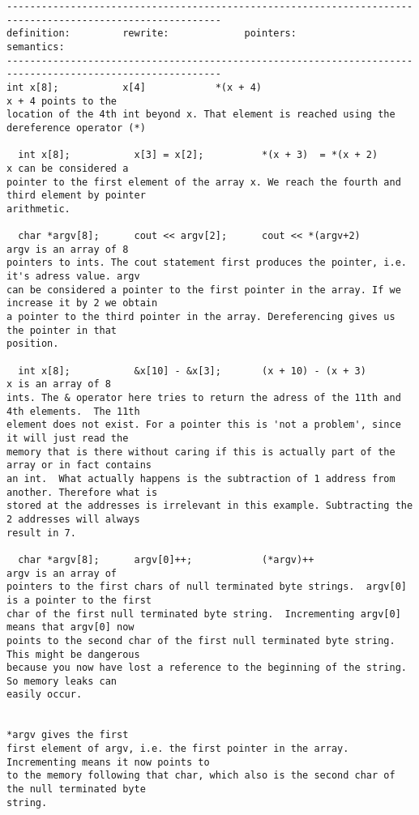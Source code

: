\documentclass{article}[9pt]
\begin{document}
\begin{verbatim}
-----------------------------------------------------------------------------------------------------------
definition:         rewrite:             pointers:                    semantics:
-----------------------------------------------------------------------------------------------------------
int x[8];           x[4]            *(x + 4)                          x + 4 points to the
location of the 4th int beyond x. That element is reached using the dereference operator (*)

  int x[8];           x[3] = x[2];          *(x + 3)  = *(x + 2)        x can be considered a
pointer to the first element of the array x. We reach the fourth and third element by pointer
arithmetic.

  char *argv[8];      cout << argv[2];      cout << *(argv+2)           argv is an array of 8
pointers to ints. The cout statement first produces the pointer, i.e. it's adress value. argv
can be considered a pointer to the first pointer in the array. If we increase it by 2 we obtain
a pointer to the third pointer in the array. Dereferencing gives us the pointer in that
position.

  int x[8];           &x[10] - &x[3];       (x + 10) - (x + 3)          x is an array of 8
ints. The & operator here tries to return the adress of the 11th and 4th elements.  The 11th
element does not exist. For a pointer this is 'not a problem', since it will just read the
memory that is there without caring if this is actually part of the array or in fact contains
an int.  What actually happens is the subtraction of 1 address from another. Therefore what is
stored at the addresses is irrelevant in this example. Subtracting the 2 addresses will always
result in 7. 

  char *argv[8];      argv[0]++;            (*argv)++                   argv is an array of
pointers to the first chars of null terminated byte strings.  argv[0] is a pointer to the first
char of the first null terminated byte string.  Incrementing argv[0] means that argv[0] now
points to the second char of the first null terminated byte string. This might be dangerous
because you now have lost a reference to the beginning of the string. So memory leaks can
easily occur.

                                                                        *argv gives the first
first element of argv, i.e. the first pointer in the array. Incrementing means it now points to
to the memory following that char, which also is the second char of the null terminated byte
string.


\end{verbatim}
\end{document}
